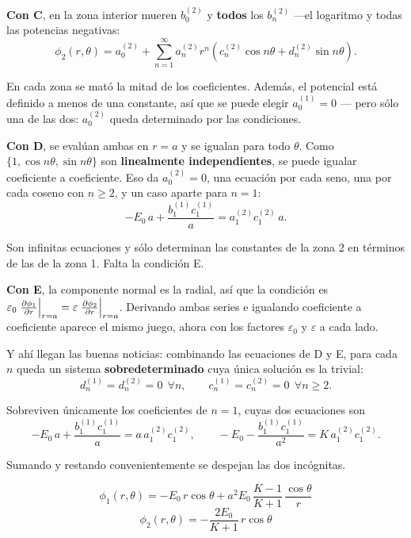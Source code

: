 \documentclass[12pt,a4paper]{article}
\begin{document}
\textbf{Con C}, en la zona interior mueren $b_0^{(2)}$ y \textbf{todos} los
$b_n^{(2)}$ ---el logaritmo y todas las potencias negativas:
\[
\phi_2(r,\theta) = a_0^{(2)}
+ \sum_{n=1}^{\infty} a_n^{(2)} r^{n}
\left(c_n^{(2)} \cos n\theta + d_n^{(2)} \sin n\theta\right).
\]

\begin{notebox}
En cada zona se mató la mitad de los coeficientes. Además, el potencial está
definido a menos de una constante, así que se puede elegir $a_0^{(1)} = 0$ ---
pero sólo una de las dos: $a_0^{(2)}$ queda determinado por las condiciones.
\end{notebox}

\textbf{Con D}, se evalúan ambas en $r=a$ y se igualan para todo $\theta$. Como
$\{1, \cos n\theta, \sin n\theta\}$ son \textbf{linealmente independientes}, se
puede igualar coeficiente a coeficiente. Eso da $a_0^{(2)} = 0$, una ecuación por
cada seno, una por cada coseno con $n\ge 2$, y un caso aparte para $n=1$:
\[
-E_0\,a + \frac{b_1^{(1)} c_1^{(1)}}{a} = a_1^{(2)} c_1^{(2)}\, a .
\]

\begin{notebox}
Son infinitas ecuaciones y sólo determinan las constantes de la zona 2 en
términos de las de la zona 1. Falta la condición E.
\end{notebox}

\textbf{Con E}, la componente normal es la radial, así que la condición es
$\varepsilon_0 \left.\pdv{\phi_1}{r}\right|_{r=a}
= \varepsilon \left.\pdv{\phi_2}{r}\right|_{r=a}$. Derivando ambas series e
igualando coeficiente a coeficiente aparece el mismo juego, ahora con los
factores $\varepsilon_0$ y $\varepsilon$ a cada lado.

Y ahí llegan las buenas noticias: combinando las ecuaciones de D y E, para cada
$n$ queda un sistema \textbf{sobredeterminado} cuya única solución es la trivial:
\[
d_n^{(1)} = d_n^{(2)} = 0 \ \ \forall n,
\qquad
c_n^{(1)} = c_n^{(2)} = 0 \ \ \forall n \ge 2 .
\]

Sobreviven únicamente los coeficientes de $n=1$, cuyas dos ecuaciones son
\[
-E_0\,a + \frac{b_1^{(1)} c_1^{(1)}}{a} = a\, a_1^{(2)} c_1^{(2)},
\qquad
-E_0 - \frac{b_1^{(1)} c_1^{(1)}}{a^2} = K\, a_1^{(2)} c_1^{(2)} .
\]

Sumando y restando convenientemente se despejan las dos incógnitas.

\begin{keybox}[Solución]
\[
\boxed{\ \phi_1(r,\theta) = -E_0\, r\cos\theta
+ a^2 E_0\,\frac{K-1}{K+1}\,\frac{\cos\theta}{r}\ }
\]
\[
\boxed{\ \phi_2(r,\theta) = -\frac{2 E_0}{K+1}\, r\cos\theta\ }
\]
\end{keybox}
\end{document}
